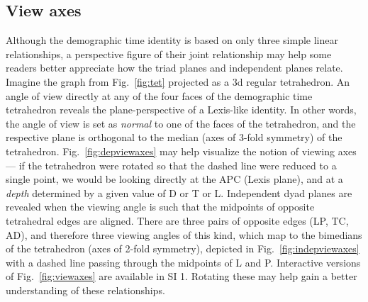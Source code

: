 \documentclass{bmcart}
\begin{document}
\subsection*{View axes}
\label{sec:viewaxes}
Although the demographic time identity is based on only three simple linear relationships, a perspective figure of their joint relationship may help some readers better appreciate how the triad planes and independent planes relate. Imagine the graph from Fig.~\ref{fig:tet} projected as a 3d regular tetrahedron. An angle of view directly at any of the four faces of the demographic time tetrahedron reveals the plane-perspective of a Lexis-like identity. In other words, the angle of view is set as \emph{normal} to one of the faces of the tetrahedron, and the respective plane is orthogonal to the median (axes of 3-fold symmetry) of the tetrahedron. Fig.~\ref{fig:depviewaxes} may help visualize the notion of viewing axes--- if the tetrahedron were rotated so that the dashed line were reduced to a single point, we would be looking directly at the APC (Lexis plane), and at a \emph{depth} determined by a given value of D or T or L. Independent dyad planes are revealed when the viewing angle is such that the midpoints of opposite tetrahedral edges are aligned. There are three pairs of opposite edges (LP, TC, AD), and therefore three viewing angles of this kind, which map to the bimedians of the tetrahedron (axes of 2-fold symmetry), depicted in Fig.~\ref{fig:indepviewaxes} with a dashed line passing through the midpoints of L and P. Interactive versions of Fig.~\ref{fig:viewaxes} are available in SI 1. Rotating these may help gain a better understanding of these relationships.
\end{document}
